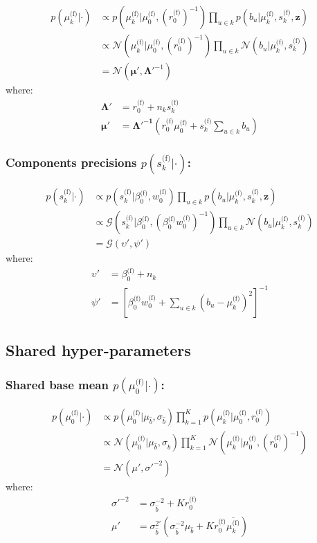 \documentclass[smallextended]{svjour3}          %
\newcommand{\muo}{\mu_{0}^\text{(f)}}
\newcommand{\ro}{r_{0}^\text{(f)}}
\newcommand{\invro}{\left(r_{0}^\text{(f)}\right)^{-1}}
\newcommand{\wo}{w_{0}^\text{(f)}}
\newcommand{\betaof}{\beta_{0}^\text{(f)}}
\newcommand{\muk}{\mu_{k}^\text{(f)}}
\newcommand{\sk}{s_{k}^\text{(f)}}
\begin{document}
\begin{align*}
p(\muk | \cdot ) 
&\propto
p\left(\muk | \muo, \invro\right) 
\prod_{u \in k} p(b_u | \muk, \sk, \mathbf{z})\\
&\propto
\mathcal{N}\left(\muk | \muo, \invro\right) 
\prod_{u \in k} \mathcal{N}(b_u | \muk, \sk)\\
&=\mathcal{N}(\boldsymbol{\mu'}, \boldsymbol{\Lambda'}^{-1})
\end{align*}
where:
\begin{align*}
\boldsymbol{\Lambda'} &= \ro + n_k \sk\\ 
\boldsymbol{\mu'} &= \boldsymbol{\Lambda'^{-1}} \left(\ro \muo + \sk \sum_{u\in k} b_u\right)
\end{align*}


\subsubsection*{Components precisions $p(\sk | \cdot )$:}
\begin{align*}
p(\sk | \cdot ) 
&\propto 
p(\sk |\betaof, \wo)
\prod_{u \in k} p(b_u | \muk, \sk, \mathbf{z})\\
&\propto
\mathcal{G}\left(\sk |\betaof, \left(\betaof\wo\right)^{-1}\right)
\prod_{u \in k} \mathcal{N}(b_u | \muk, \sk)\\
&=
\mathcal{G}(\upsilon', \psi')
\end{align*}
where:
\begin{align*}
\upsilon' &= \betaof + n_k\\
\psi' &=
\left[ \betaof \wo + \sum_{u \in k} \left(b_u - \muk\right)^2  \right]^{-1}
\end{align*}

\subsection{Shared hyper-parameters}
\subsubsection*{Shared base mean $p(\muo | \cdot)$:}
\begin{align*}
p(\muo | \cdot) 
&\propto  
p(\muo | \mu_{\hat{b}}, \sigma_{\hat{b}})
\prod_{k = 1}^K p(\muk | \muo, \ro )  \\
&\propto
\mathcal{N}(\muo | \mu_{\hat{b}}, \sigma_{\hat{b}})
\prod_{k = 1}^K\mathcal{N}\left(\muk | \muo, \invro\right)  \\
&= \mathcal{N}(\mu', \sigma'^{-2})
\end{align*}
where:
\begin{align*}
\sigma'^{-2} &= \sigma_{\hat{b}}^{-2} + K \ro\\ 
\mu' &= \sigma_{\hat{b}}^{2'} (\sigma_{\hat{b}}^{-2} 
\mu_{\hat{b}} + K \ro \overline{\muk})
\end{align*}
\end{document}
